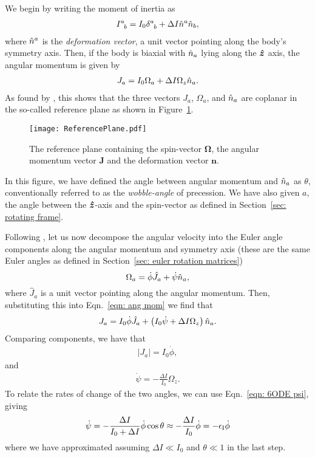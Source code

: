 \documentclass[../full_thesis/full_thesis.tex]{subfiles}
\begin{document}
We begin by writing the moment of inertia as
\begin{align}
I^{a}_{\;\;b} = I_{0} \delta^{a}_{\;\;b} + \Delta I \hat{n}^a \hat{n}_b,
\end{align}
where $\hat{n}^a$ is the \emph{deformation vector}, a unit vector pointing along the
body's symmetry axis. Then, if the body is biaxial with $\hat{n}_{a}$ lying along
the $\boldsymbol{\hat{z}}$ axis, the angular momentum is given by
\begin{align}
J_{a} = I_0 \Omega_a + \Delta I \Omega_z \hat{n}_a.
\label{eqn: ang mom}
\end{align}
As found by \citet{Pines1972}, this shows that the three vectors $J_a$,
$\Omega_a$, and $\hat{n}_a$ are coplanar in the so-called reference plane as shown in
Figure~\ref{fig: reference plane}.
\begin{figure}[htb]
    \texttt{[image: ReferencePlane.pdf]}
    \caption{The reference plane containing the spin-vector $\mathbf{\Omega}$,
    the angular momentum vector $\mathbf{J}$ and the deformation vector $\mathbf{n}$.}
    \label{fig: reference plane}
\end{figure}
In this figure, we have defined the angle between angular momentum and $\hat{n}_a$ as
$\theta$, conventionally referred to as the \emph{wobble-angle} of
precession. We have also given $a$, the angle between the $\boldsymbol{\hat{z}}$-axis and the
spin-vector as defined in Section~\ref{sec: rotating frame}.

Following \citet{Jones2001}, let us now decompose the angular velocity into the
Euler angle components along the angular momentum and symmetry axis (these
are the same Euler angles as defined in Section~\ref{sec: euler rotation
matrices})
\begin{equation}
  \Omega_a = \dot{\phi}\hat{J}_a + \dot{\psi}\hat{n}_{a},
\label{eqn: decomp}
\end{equation}
where $\hat{J}_a$ is a unit vector pointing along the angular momentum. Then,
substituting this into Eqn.~\eqref{eqn: ang mom} we find that
\begin{align}
J_a = I_0 \dot{\phi} \hat{J}_a + \left(I_0 \dot{\psi} + \Delta I \Omega_z\right)\hat{n}_a.
\end{align}
Comparing components, we have that
\begin{align}
|J_a| = I_0 \dot{\phi},
\end{align}
and
\begin{align}
\dot{\psi} = -\frac{\Delta I}{I_0} \Omega_z.
\end{align}
To relate the rates of change of the two angles, we can use Eqn.~\eqref{eqn:
6ODE psi}, giving
\begin{align}
\dot{\psi} = - \frac{\Delta I}{I_0 + \Delta I} \dot{\phi} \cos\theta
\approx -\frac{\Delta I}{I_0} \dot{\phi} = -\epsilon_{\mathrm{I}} \dot{\phi}
\label{eqn: psi phi}
\end{align}
where we have approximated assuming $\Delta I \ll I_0$ and $\theta \ll 1$ in
the last step.
\end{document}
